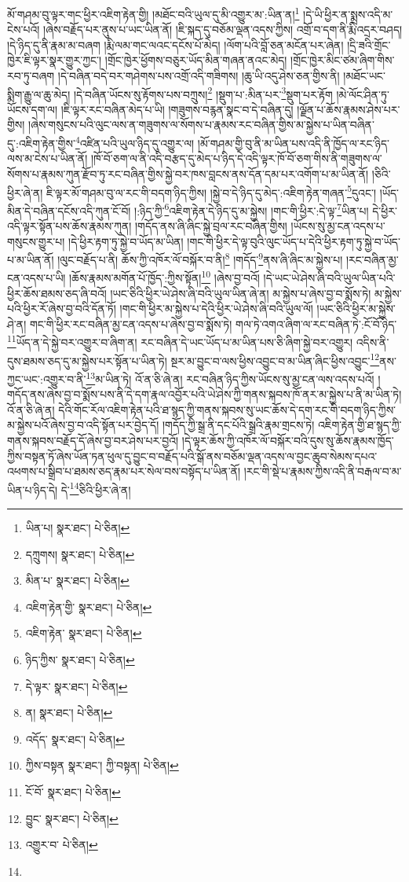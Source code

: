 མོ་གཤམ་བུ་ལྟར་གང་ཕྱིར་འཇིག་རྟེན་གྱི། །མཐོང་བའི་ཡུལ་དུ་མི་འགྱུར་མ་:ཡིན་ན།\footnote{ཡིན་པ།  སྣར་ཐང་།  པེ་ཅིན། } །དེ་ཡི་ཕྱིར་ན་སྨྲས་འདི་མ་ངེས་པའོ། །ཞེས་བརྗོད་པར་ནུས་པ་ཡང་ཡིན་ནོ། །ཇི་སྐད་དུ་བཅོམ་ལྡན་འདས་ཀྱིས། འགྲོ་བ་དག་ནི་རྨི་འདྲར་བཤད། །དེ་ཉིད་དུ་ནི་རྣམ་མ་བཞག །རྨི་ལམ་གང་ལའང་དངོས་པོ་མེད། །ལོག་པའི་བློ་ཅན་མངོན་པར་ཞེན། །དྲི་ཟའི་གྲོང་ཁྱེར་ཇི་ལྟར་སྣར་གྱུར་ཀྱང་། །གྲོང་ཁྱེར་ཕྱོགས་བཅུར་ཡོད་མིན་གཞན་ནའང་མེད། །གྲོང་ཁྱེར་མིང་ཙམ་ཞིག་གིས་རབ་ཏུ་བཞག །དེ་བཞིན་བདེ་བར་གཤེགས་པས་འགྲོ་འདི་གཟིགས། །ཆུ་ཡི་འདུ་ཤེས་ཅན་གྱིས་ནི། །མཐོང་ཡང་སྨིག་རྒྱུ་ལ་ཆུ་མེད། །དེ་བཞིན་ཡོངས་སུ་རྟོགས་པས་བཀྲུས།\footnote{དཀྲུགས།  སྣར་ཐང་།  པེ་ཅིན། } །སྡུག་པ་:མིན་པར་\footnote{མིན་པ་  སྣར་ཐང་།  པེ་ཅིན། }སྡུག་པར་རྟོག །མེ་ལོང་ཤིན་ཏུ་ཡོངས་དག་ལ། །ཇི་ལྟར་རང་བཞིན་མེད་པ་ཡི། །གཟུགས་བརྙན་སྣང་བ་དེ་བཞིན་དུ། །ལྗོན་པ་ཆོས་རྣམས་ཤེས་པར་གྱིས། །ཞེས་གསུངས་པའི་ལུང་ལས་ན་གཟུགས་ལ་སོགས་པ་རྣམས་རང་བཞིན་གྱིས་མ་སྐྱེས་པ་ཡིན་བཞིན་དུ་:འཇིག་རྟེན་གྱིས་\footnote{འཇིག་རྟེན་གྱི་  སྣར་ཐང་།  པེ་ཅིན། }འཛིན་པའི་ཡུལ་ཉིད་དུ་འགྱུར་ལ། །མོ་གཤམ་གྱི་བུ་ནི་མ་ཡིན་པས་འདི་ནི་ཁྱོད་ལ་རང་ཉིད་ལས་མ་ངེས་པ་ཡིན་ནོ། །ཁོ་བོ་ཅག་ལ་ནི་འདི་བརྩད་དུ་མེད་པ་ཉིད་དེ་འདི་ལྟར་ཁོ་བོ་ཅག་གིས་ནི་གཟུགས་ལ་སོགས་པ་རྣམས་ཀུན་རྫོབ་ཏུ་རང་བཞིན་གྱིས་སྐྱེ་བར་ཁས་བླངས་ནས་དོན་དམ་པར་འགོག་པ་མ་ཡིན་ནོ། །ཅིའི་ཕྱིར་ཞེ་ན། ཇི་ལྟར་མོ་གཤམ་བུ་ལ་རང་གི་བདག་ཉིད་ཀྱིས། །སྐྱེ་བ་དེ་ཉིད་དུ་མེད་:འཇིག་རྟེན་གཞན་\footnote{འཇིག་རྟེན་  སྣར་ཐང་།  པེ་ཅིན། }དུའང་། །ཡོད་མིན་དེ་བཞིན་དངོས་འདི་ཀུན་ངོ་བོ། །:ཉིད་ཀྱི་\footnote{ཉིད་ཀྱིས་  སྣར་ཐང་།  པེ་ཅིན། }འཇིག་རྟེན་དེ་ཉིད་དུ་མ་སྐྱེས། །གང་གི་ཕྱིར་:དེ་ལྟ་\footnote{དེ་ལྟར་  སྣར་ཐང་།  པེ་ཅིན། }ཡིན་པ། དེ་ཕྱིར་འདི་ལྟར་སྟོན་པས་ཆོས་རྣམས་ཀུན། །གདོད་ནས་ཞི་ཞིང་སྐྱེ་བྲལ་རང་བཞིན་གྱིས། །ཡོངས་སུ་མྱ་ངན་འདས་པ་གསུངས་གྱུར་པ། །དེ་ཕྱིར་རྟག་ཏུ་སྐྱེ་བ་ཡོད་མ་ཡིན། །གང་གི་ཕྱིར་དེ་ལྟ་བུའི་ལུང་ཡོད་པ་དེའི་ཕྱིར་རྟག་ཏུ་སྐྱེ་བ་ཡོད་པ་མ་ཡིན་ནོ། །ལུང་བརྗོད་པ་ནི། ཆོས་ཀྱི་འཁོར་ལོ་བསྐོར་བ་ནི།\footnote{ན།  སྣར་ཐང་།  པེ་ཅིན། } །གདོད་\footnote{འདོད་  སྣར་ཐང་།  པེ་ཅིན། }ནས་ཞི་ཞིང་མ་སྐྱེས་པ། །རང་བཞིན་མྱ་ངན་འདས་པ་ཡི། །ཆོས་རྣམས་མགོན་པོ་ཁྱོད་:ཀྱིས་སྟོན།\footnote{ཀྱིས་བསྟན  སྣར་ཐང་། ཀྱི་བསྟན།  པེ་ཅིན། } །ཞེས་བྱ་བའོ། །དེ་ཡང་ཡེ་ཤེས་ཞི་བའི་ཡུལ་ཡིན་པའི་ཕྱིར་ཆོས་ཐམས་ཅད་ཞི་བའོ། །ཡང་ཅིའི་ཕྱིར་ཡེ་ཤེས་ཞི་བའི་ཡུལ་ཡིན་ཞེ་ན། མ་སྐྱེས་པ་ཞེས་བྱ་བ་སྨོས་ཏེ། མ་སྐྱེས་པའི་ཕྱིར་རོ་ཞེས་བྱ་བའི་དོན་ཏོ། །གང་གི་ཕྱིར་མ་སྐྱེས་པ་དེའི་ཕྱིར་ཡེ་ཤེས་ཞི་བའི་ཡུལ་ལོ། །ཡང་ཅིའི་ཕྱིར་མ་སྐྱེས་ཤེ་ན། གང་གི་ཕྱིར་རང་བཞིན་མྱ་ངན་འདས་པ་ཞེས་བྱ་བ་སྨོས་ཏེ། གལ་ཏེ་འགའ་ཞིག་ལ་རང་བཞིན་ཏེ་:ངོ་བོ་ཉིད་\footnote{ངོ་བོ་  སྣར་ཐང་།  པེ་ཅིན། }ཡོད་ན་དེ་སྐྱེ་བར་འགྱུར་བ་ཞིག་ན། རང་བཞིན་དེ་ཡང་ཡོད་པ་མ་ཡིན་པས་ཅི་ཞིག་སྐྱེ་བར་འགྱུར། འདིས་ནི་དུས་ཐམས་ཅད་དུ་མ་སྐྱེས་པར་སྟོན་པ་ཡིན་ཏེ། སྔར་མ་བྱུང་བ་ལས་ཕྱིས་འབྱུང་བ་མ་ཡིན་ཞིང་ཕྱིས་འབྱུང་\footnote{བྱུང་  སྣར་ཐང་།  པེ་ཅིན། }ནས་ཀྱང་ཡང་:འགྱུར་བ་ནི་\footnote{འགྱུར་བ་  པེ་ཅིན། }མ་ཡིན་ཏེ། འོ་ན་ཅི་ཞེ་ན། རང་བཞིན་ཉིད་ཀྱིས་ཡོངས་སུ་མྱ་ངན་ལས་འདས་པའོ། །གདོད་ནས་ཞེས་བྱ་བ་སྨོས་པས་ནི་དེ་དག་རྣལ་འབྱོར་པའི་ཡེ་ཤེས་ཀྱི་གནས་སྐབས་ཁོ་ནར་མ་སྐྱེས་པ་ནི་མ་ཡིན་ཏེ། འོ་ན་ཅི་ཞེ་ན། དེའི་གོང་རོལ་འཇིག་རྟེན་པའི་ཐ་སྙད་ཀྱི་གནས་སྐབས་སུ་ཡང་ཆོས་དེ་དག་རང་གི་བདག་ཉིད་ཀྱིས་མ་སྐྱེས་པའོ་ཞེས་བྱ་བ་འདི་སྟོན་པར་བྱེད་དོ། །གདོད་ཀྱི་སྒྲ་ནི་དང་པོའི་སྒྲའི་རྣམ་གྲངས་ཏེ། འཇིག་རྟེན་གྱི་ཐ་སྙད་ཀྱི་གནས་སྐབས་བརྗོད་དོ་ཞེས་བྱ་བར་ཤེས་པར་བྱའོ། །དེ་ལྟར་ཆོས་ཀྱི་འཁོར་ལོ་བསྐོར་བའི་དུས་སུ་ཆོས་རྣམས་ཁྱོད་ཀྱིས་བསྟན་ཏོ་ཞེས་ཡོན་ཏན་ཕུལ་དུ་བྱུང་བ་བརྗོད་པའི་སྒོ་ནས་བཅོམ་ལྡན་འདས་ལ་བྱང་ཆུབ་སེམས་དཔའ་འཕགས་པ་སྒྲིབ་པ་ཐམས་ཅད་རྣམ་པར་སེལ་བས་བསྟོད་པ་ཡིན་ནོ། །རང་གི་སྡེ་པ་རྣམས་ཀྱིས་འདི་ནི་བརྒལ་བ་མ་ཡིན་པ་ཉིད་དེ། དེ་\footnote{}ཅིའི་ཕྱིར་ཞེ་ན། 